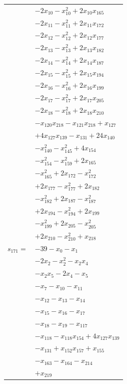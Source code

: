 \begin{longtable}{@{}r@{\;}l@{}}
 & \(\displaystyle -2x_{10} -x_{10}^{2} +2x_{10}x_{165}\) \\
 & \(\displaystyle -2x_{11} -x_{11}^{2} +2x_{11}x_{172}\) \\
 & \(\displaystyle -2x_{12} -x_{12}^{2} +2x_{12}x_{177}\) \\
 & \(\displaystyle -2x_{13} -x_{13}^{2} +2x_{13}x_{182}\) \\
 & \(\displaystyle -2x_{14} -x_{14}^{2} +2x_{14}x_{187}\) \\
 & \(\displaystyle -2x_{15} -x_{15}^{2} +2x_{15}x_{194}\) \\
 & \(\displaystyle -2x_{16} -x_{16}^{2} +2x_{16}x_{199}\) \\
 & \(\displaystyle -2x_{17} -x_{17}^{2} +2x_{17}x_{205}\) \\
 & \(\displaystyle -2x_{18} -x_{18}^{2} +2x_{18}x_{210}\) \\
 & \(\displaystyle -x_{120}x_{218} -x_{121}x_{218} +x_{127}\) \\
 & \(\displaystyle +4x_{127}x_{139} -x_{131} +24x_{140}\) \\
 & \(\displaystyle -x_{140}^{2} -x_{145}^{2} +4x_{154}\) \\
 & \(\displaystyle -x_{154}^{2} -x_{159}^{2} +2x_{165}\) \\
 & \(\displaystyle -x_{165}^{2} +2x_{172} -x_{172}^{2}\) \\
 & \(\displaystyle +2x_{177} -x_{177}^{2} +2x_{182}\) \\
 & \(\displaystyle -x_{182}^{2} +2x_{187} -x_{187}^{2}\) \\
 & \(\displaystyle +2x_{194} -x_{194}^{2} +2x_{199}\) \\
 & \(\displaystyle -x_{199}^{2} +2x_{205} -x_{205}^{2}\) \\
 & \(\displaystyle +2x_{210} -x_{210}^{2} +x_{218}\) \\[3pt]
\(s_{171}=\) & \(\displaystyle -39 -x_{0} -x_{1}\) \\
 & \(\displaystyle -2x_{2} -x_{2}^{2} -x_{2}x_{4}\) \\
 & \(\displaystyle -x_{2}x_{5} -2x_{4} -x_{5}\) \\
 & \(\displaystyle -x_{7} -x_{10} -x_{11}\) \\
 & \(\displaystyle -x_{12} -x_{13} -x_{14}\) \\
 & \(\displaystyle -x_{15} -x_{16} -x_{17}\) \\
 & \(\displaystyle -x_{18} -x_{19} -x_{117}\) \\
 & \(\displaystyle -x_{118} -x_{118}x_{154} +4x_{127}x_{139}\) \\
 & \(\displaystyle -x_{131} +x_{152}x_{157} +x_{155}\) \\
 & \(\displaystyle -x_{163} -x_{164} -x_{214}\) \\
 & \(\displaystyle +x_{219}\) \\[3pt]
\end{longtable}
\endgroup
